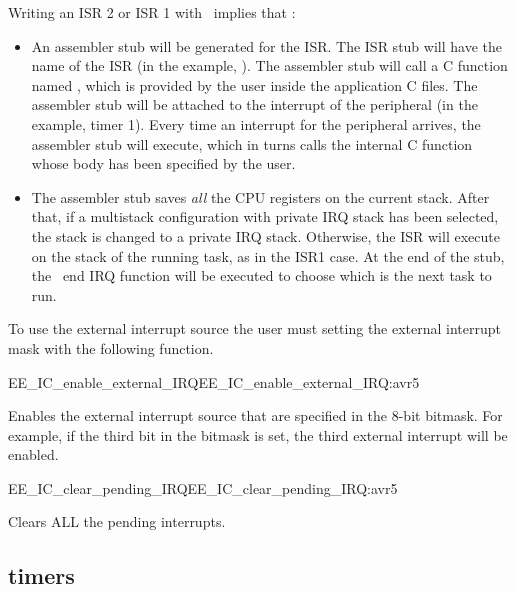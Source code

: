 Writing an ISR 2 or ISR 1 with \ee\ implies that :
\begin{itemize}
\item An assembler stub will be generated for the ISR. The ISR stub
  will have the name of the ISR (in the example,
  ). The assembler stub will call a C function
  named , which is provided by the user inside the
  application C files. The assembler stub will be attached to the
  interrupt of the peripheral (in the example, timer 1). Every time an
  interrupt for the peripheral arrives, the assembler stub will
  execute, which in turns calls the internal C function whose body has
  been specified by the user.
\item The assembler stub saves {\em all} the CPU registers on the
  current stack. After that, if a multistack configuration with
  private IRQ stack has been selected, the stack is changed to a
  private IRQ stack. Otherwise, the ISR will execute on the stack of
  the running task, as in the ISR1 case.  At the end of the stub, the
  \ee\ end IRQ function will be executed to choose which is the next
  task to run.
\end{itemize}

To use the external interrupt source the user must setting the external 
interrupt mask with the following function. 

\begin{function_nopb2}{EE\_IC\_enable\_external\_IRQ}{EE_IC_enable_external_IRQ:avr5}
  \begin{fundescription}
    Enables the external interrupt source that are specified in the
    8-bit bitmask. For example, if the third bit in the bitmask is
    set, the third external interrupt will be enabled.
  \end{fundescription}
\end{function_nopb2}


\begin{function_nopb2}{EE\_IC\_clear\_pending\_IRQ}{EE_IC_clear_pending_IRQ:avr5}
  \begin{fundescription}
    Clears ALL the pending interrupts.
  \end{fundescription}
\end{function_nopb2}

\subsection{\avr timers}

